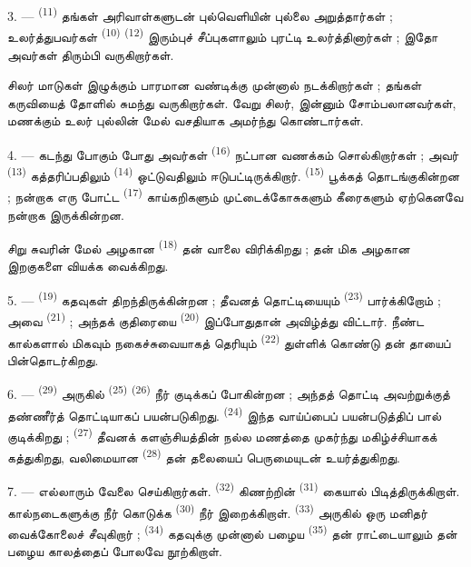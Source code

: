 3. ---  \textsuperscript{(11)} தங்கள்
அரிவாள்களுடன் புல்வெளியின் புல்லை அறுத்தார்கள் ; உலர்த்துபவர்கள்
 \textsuperscript{(10)} 
\textsuperscript{(12)} இரும்புச் சீப்புகளாலும் புரட்டி உலர்த்தினார்கள் ;
இதோ அவர்கள் திரும்பி வருகிறார்கள்.

சிலர் மாடுகள் இழுக்கும் பாரமான வண்டிக்கு முன்னால் நடக்கிறார்கள் ;
தங்கள் கருவியைத் தோளில் சுமந்து வருகிறார்கள். வேறு சிலர், இன்னும்
சோம்பலானவர்கள், மணக்கும் உலர் புல்லின் மேல் வசதியாக அமர்ந்து
கொண்டார்கள்.

4. --- கடந்து போகும் போது அவர்கள் 
\textsuperscript{(16)} நட்பான வணக்கம் சொல்கிறார்கள் ; அவர்
 \textsuperscript{(13)} 
கத்தரிப்பதிலும்  \textsuperscript{(14)}
ஒட்டுவதிலும் ஈடுபட்டிருக்கிறார். 
\textsuperscript{(15)} பூக்கத் தொடங்குகின்றன ; நன்றாக எரு போட்ட
 \textsuperscript{(17)} காய்கறிகளும்
முட்டைக்கோசுகளும் கீரைகளும் ஏற்கெனவே நன்றாக இருக்கின்றன.

சிறு சுவரின் மேல் அழகான  \textsuperscript{(18)} தன்
வாலை விரிக்கிறது ; தன் மிக அழகான இறகுகளை வியக்க வைக்கிறது.

\VUsaut{3.0mm}

5. ---  \textsuperscript{(19)} கதவுகள்
திறந்திருக்கின்றன ; தீவனத் தொட்டியையும் 
\textsuperscript{(23)} பார்க்கிறோம் ; அவை 
\textsuperscript{(21)} ; அந்தக் குதிரையை 
\textsuperscript{(20)} இப்போதுதான் அவிழ்த்து விட்டார். நீண்ட கால்களால்
மிகவும் நகைச்சுவையாகத் தெரியும் 
\textsuperscript{(22)} துள்ளிக் கொண்டு தன் தாயைப் பின்தொடர்கிறது.

6. ---  \textsuperscript{(29)} அருகில்
 \textsuperscript{(25)} 
\textsuperscript{(26)} நீர் குடிக்கப் போகின்றன ; அந்தத் தொட்டி
அவற்றுக்குத் தண்ணீர்த் தொட்டியாகப் பயன்படுகிறது.
 \textsuperscript{(24)} இந்த வாய்ப்பைப் பயன்படுத்திப்
பால் குடிக்கிறது ;  \textsuperscript{(27)} தீவனக் களஞ்சியத்தின்
நல்ல மணத்தை முகர்ந்து மகிழ்ச்சியாகக் கத்துகிறது, வலிமையான
 \textsuperscript{(28)} தன் தலையைப் பெருமையுடன்
உயர்த்துகிறது.

7. --- எல்லாரும் வேலை செய்கிறார்கள். 
\textsuperscript{(32)} கிணற்றின்  \textsuperscript{(31)}
கையால் பிடித்திருக்கிறாள். கால்நடைகளுக்கு நீர் கொடுக்க
 \textsuperscript{(30)} நீர் இறைக்கிறாள்.  \textsuperscript{(33)} அருகில் ஒரு மனிதர்
வைக்கோலைச் சீவுகிறார் ;  \textsuperscript{(34)}
கதவுக்கு முன்னால் பழைய  \textsuperscript{(35)}
தன் ராட்டையாலும் தன்  பழைய காலத்தைப் போலவே
  நூற்கிறாள்.

